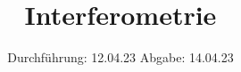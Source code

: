 

\subject{V64}
\title{Interferometrie}
\date{
  Durchführung: 12.04.23
  \hspace{3em}
  Abgabe: 14.04.23
}



\maketitle
\thispagestyle{empty}
\tableofcontents
\newpage








\newpage
\printbibliography{}
\nocite{matplotlib}
\nocite{numpy}
\nocite{scipy}
\nocite{uncertainties}
\nocite{reback2020pandas}

\newpage
% 


